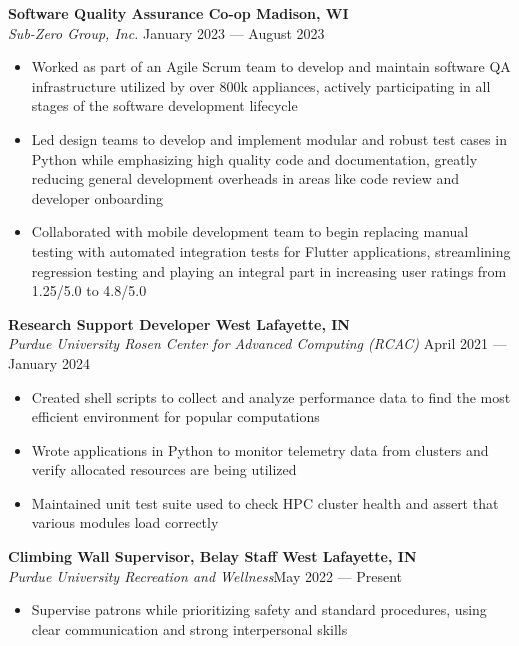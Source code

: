 \documentclass[letter,11pt]{article}
\begin{document}
\textbf{Software Quality Assurance Co-op \hfill Madison, WI}\\
\emph{Sub-Zero Group, Inc.} \hfill January 2023 --- August 2023\\
\vspace*{-1.75em}
\begin{itemize}[label=-, leftmargin=*, align=left, noitemsep]
    \item Worked as part of an Agile Scrum team to develop and maintain software QA infrastructure utilized by over 800k appliances, actively participating in all stages of the software development lifecycle
    \item Led design teams to develop and implement modular and robust test cases in Python while emphasizing high quality code and documentation, greatly reducing general development overheads in areas like code review and developer onboarding
    \item Collaborated with mobile development team to begin replacing manual testing with automated integration tests for Flutter applications, streamlining regression testing and playing an integral part in increasing user ratings from 1.25/5.0 to 4.8/5.0
\end{itemize}
\vspace*{-0.25em}

\textbf{Research Support Developer \hfill West Lafayette, IN}\\
\emph{Purdue University Rosen Center for Advanced Computing (RCAC)} \hfill April 2021 --- January 2024 \\
\vspace*{-1.75em}
\begin{itemize}[label=-, leftmargin=*, labelwidth=1.5cm, align=left, noitemsep]
    \item Created shell scripts to collect and analyze performance data to find the most efficient environment for popular computations
    \item Wrote applications in Python to monitor telemetry data from clusters and verify allocated resources are being utilized
    \item Maintained unit test suite used to check HPC cluster health and assert that various modules load correctly
\end{itemize}
\vspace*{-0.25em}

\textbf{Climbing Wall Supervisor, Belay Staff \hfill West Lafayette, IN}\\
\emph{Purdue University Recreation and Wellness}\hfill May 2022 --- Present \\
\vspace*{-1.75em}
\begin{itemize}[label=-, leftmargin=*, labelwidth=1.5cm, align=left, noitemsep]
    \item Supervise patrons while prioritizing safety and standard procedures, using clear communication and strong interpersonal skills
\end{itemize}
\end{document}

